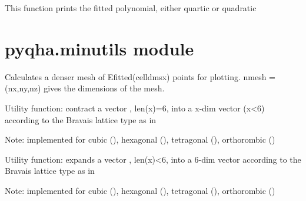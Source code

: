 \documentclass[letterpaper,10pt,english]{sphinxmanual}
\begin{document}

\begin{fulllineitems}
\label{pyqha:pyqha.fitutils.print_polynomial}
This function prints the fitted polynomial, either quartic or quadratic

\end{fulllineitems}



\section{pyqha.minutils module}
\label{pyqha:module-pyqha.minutils}\label{pyqha:pyqha-minutils-module}

\begin{fulllineitems}
\label{pyqha:pyqha.minutils.calculate_fitted_points_anis}
Calculates a denser mesh of Efitted(celldmsx) points for plotting. nmesh = (nx,ny,nz)
gives the dimensions of the mesh.

\end{fulllineitems}


\begin{fulllineitems}
\label{pyqha:pyqha.minutils.contract_vector}
Utility function: contract a vector , len(x)=6, into a x-dim vector (x\textless{}6) 
according to the Bravais lattice type as in 

Note: implemented for cubic (), hexagonal (), 
tetragonal (), orthorombic ()

\end{fulllineitems}


\begin{fulllineitems}
\label{pyqha:pyqha.minutils.expand_vector}
Utility function: expands a vector , len(x)\textless{}6, into a 6-dim vector according
to the Bravais lattice type as in 

Note: implemented for cubic (), hexagonal (), 
tetragonal (), orthorombic ()

\end{fulllineitems}
\end{document}
